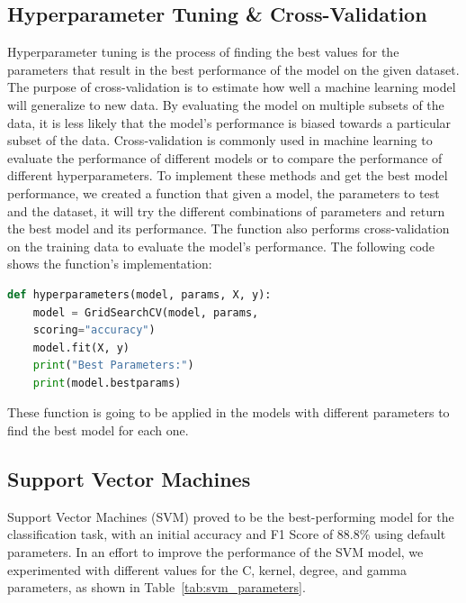 \documentclass[conference]{IEEEtran}
\begin{document}
\subsection{Hyperparameter Tuning \& Cross-Validation}
Hyperparameter tuning is the process of finding the best values for the parameters that result in the best performance of the model on the given dataset.
The purpose of cross-validation is to estimate how well a machine learning model will generalize to new data. By evaluating the model on multiple subsets of the data, it is less likely that the model's performance is biased towards a particular subset of the data. Cross-validation is commonly used in machine learning to evaluate the performance of different models or to compare the performance of different hyperparameters.
To implement these methods and get the best model performance, we created a function that given a model, the parameters to test and the dataset, it will try the different combinations of parameters and return the best model and its performance. The function also performs cross-validation on the training data to evaluate the model's performance. The following code shows the function's implementation:

\begin{lstlisting}[language=Python]
def hyperparameters(model, params, X, y):
    model = GridSearchCV(model, params, 
    scoring="accuracy")
    model.fit(X, y)
    print("Best Parameters:")
    print(model.bestparams)
\end{lstlisting}

These function is going to be applied in the models with different parameters to find the best model for each one.

\subsection{Support Vector Machines}
Support Vector Machines (SVM) proved to be the best-performing model for the classification task, with an initial accuracy and F1 Score of 88.8\% using default parameters. In an effort to improve the performance of the SVM model, we experimented with different values for the C, kernel, degree, and gamma parameters, as shown in Table~\ref{tab:svm_parameters}.
\end{document}
